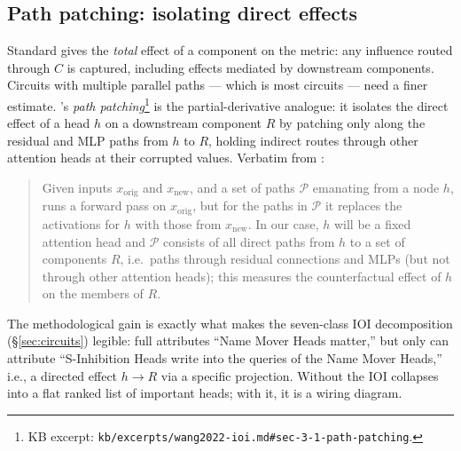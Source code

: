 \subsection{Path patching: isolating direct effects}
\label{sec:patching-path}

Standard  gives the \emph{total} effect of a
component on the metric: any influence routed through $C$ is captured,
including effects mediated by downstream components. Circuits with
multiple parallel paths --- which is most circuits --- need a finer
estimate. \citet[\S 3.1]{wang2022-ioi}'s \emph{path
patching}\footnote{KB excerpt:
\nolinkurl{kb/excerpts/wang2022-ioi.md#sec-3-1-path-patching}.} is the
partial-derivative analogue: it isolates the direct effect of a head
$h$ on a downstream component $R$ by patching only along the residual
and MLP paths from $h$ to $R$, holding indirect routes through other
attention heads at their corrupted values. Verbatim from
\citet[\S 3.1]{wang2022-ioi}:

\begin{quote}
Given inputs $x_{\text{orig}}$ and $x_{\text{new}}$, and a set of paths
$\mathcal{P}$ emanating from a node $h$,  runs a forward
pass on $x_{\text{orig}}$, but for the paths in $\mathcal{P}$ it
replaces the activations for $h$ with those from $x_{\text{new}}$. In
our case, $h$ will be a fixed attention head and $\mathcal{P}$
consists of all direct paths from $h$ to a set of components $R$, i.e.\
paths through residual connections and MLPs (but not through other
attention heads); this measures the counterfactual effect of $h$ on
the members of $R$.
\end{quote}

The methodological gain is exactly what makes the seven-class IOI
decomposition (\S\ref{sec:circuits}) legible: full 
attributes ``Name Mover Heads matter,'' but only \glsterm{path-patching}{path patching} can
attribute ``S-Inhibition Heads write into the queries of the Name
Mover Heads,'' i.e., a directed effect $h \to R$ via a specific
projection. Without  the IOI  collapses into a
flat ranked list of important heads; with it, it is a wiring diagram.

